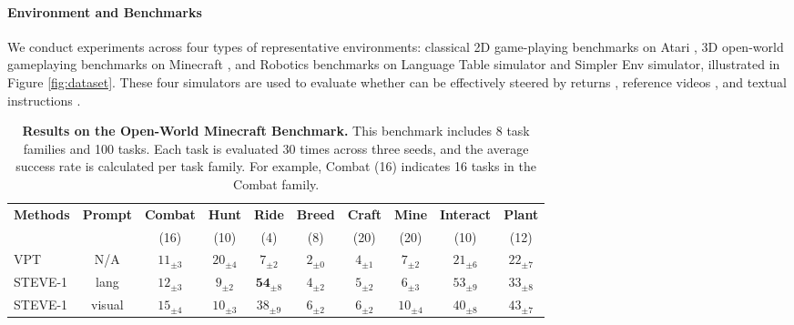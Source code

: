 \paragraph{Environment and Benchmarks} 
We conduct experiments across four types of representative environments: classical 2D game-playing benchmarks on Atari \citep{atari}, 3D open-world gameplaying benchmarks on Minecraft \citep{malmo,mcu}, and Robotics benchmarks on Language Table simulator \citep{language_table} and Simpler Env simulator\citep{simpler_env}, illustrated in Figure \ref{fig:dataset}. 
These four simulators are used to evaluate whether \agent can be effectively steered by returns \citep{dt,dqn}, reference videos \citep{groot1,bcz}, and textual instructions \citep{rt-1,rt-2}. 


\begin{table}[]
\footnotesize
\setlength{\tabcolsep}{2.6 mm}
\centering
\caption{
    \textbf{Results on the Open-World Minecraft Benchmark.}
    This benchmark includes 8 task families and 100 tasks. Each task is evaluated 30 times across three seeds, and the average success rate is calculated per task family. For example, Combat (16) indicates 16 tasks in the Combat family.
}  \label{tab:minecraft}
\renewcommand{\arraystretch}{1.0}
\begin{adjustbox}{width=\linewidth}
\begin{tabular}{@{}lccccccccc@{}}
\toprule
\multirow{2}{*}{\textbf{Methods}} & \multirow{2}{*}{\textbf{Prompt}} & \textbf{Combat} & \textbf{Hunt} & \textbf{Ride} & \textbf{Breed} & \textbf{Craft} & \textbf{Mine} & \textbf{Interact} & \textbf{Plant} \\
                         &                          & (16)    & (10) & (4)  & (8)   & (20)  & (20) & (10)     & (12)  \\ \midrule
VPT              & N/A & $11_{\pm 3}$                    & $20_{\pm4}$                  & $7_{\pm2}$                 & $2_{\pm0}$                 & $4_{\pm1}$                   & $7_{\pm2}$                  & $21_{\pm 6}$                      & $22_{\pm 7}$                   \\
STEVE-1          & lang & $12_{\pm 3}$                    & $9_{\pm 2}$                  & $\mathbf{54}_{\pm 8}$                 & $4_{\pm 2}$                 & $5_{\pm 2}$                   & $6_{\pm 3}$                  & $53_{\pm 9}$                      & $33_{\pm 8}$                   \\
STEVE-1          & visual & $15_{\pm 4}$                    & $10_{\pm 3}$                  & $38_{\pm 9}$                 & $6_{\pm 2}$                 & $6_{\pm 2}$                   & $10_{\pm 4}$                  & $40_{\pm 8}$                      & $43_{\pm 7}$                   \\

\end{tabular}
\end{adjustbox}
\end{table}
